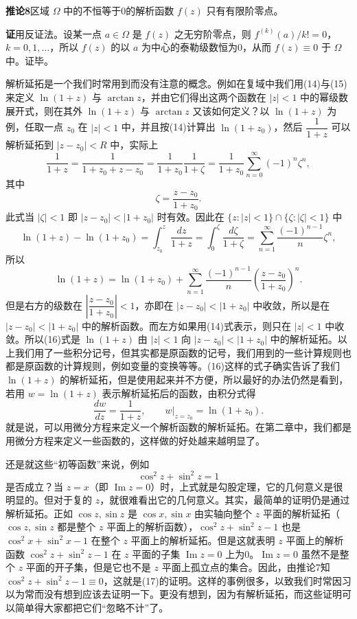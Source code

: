 \noindent\textbf{推论8}\quad 区域 $\Omega$ 中的不恒等于0的解析函数 $f(z)$ 只有有限阶零点。

\noindent\textbf{证}\quad 用反证法。设某一点 $a\in\Omega$ 是 $f(z)$ 之无穷阶零点，则 $f^{(k)}(a)/k!=0$，$k=0,1,\ldots$，所以 $f(z)$ 的以 $a$ 为中心的泰勒级数恒为0，从而 $f(z)\equiv0$ 于 $\Omega$ 中。证毕。

解析延拓是一个我们时常用到而没有注意的概念。例如在复域中我们用(14)与(15)来定义 $\ln(1+z)$ 与 $\arctan z$，并由它们得出这两个函数在 $|z|<1$ 中的幂级数展开式，则在其外 $\ln(1+z)$ 与 $\arctan z$ 又该如何定义？以 $\ln(1+z)$ 为例，任取一点 $z_0$ 在 $|z|<1$ 中，并且按(14)计算出 $\ln(1+z_0)$，然后 $\dfrac1{1+z}$ 可以解析延拓到 $|z-z_0|<R$ 中，实际上
\[
 \frac1{1+z}=\frac1{1+z_0+z-z_0}
 =\frac1{1+z_0}\frac1{1+\zeta}
 =\frac1{1+z_0}\sum_{n=0}^{\infty}(-1)^n\zeta^n,
\]
其中
\[
 \zeta=\frac{z-z_0}{1+z_0}.
\]
此式当 $|\zeta|<1$ 即 $|z-z_0|<|1+z_0|$ 时有效。因此在 $\{z:|z|<1\}\cap\{\zeta:|\zeta|<1\}$ 中
\[
 \ln(1+z)-\ln(1+z_0)=\int_{z_0}^{z}\frac{dz}{1+z}
 =\int_0^{\zeta}\frac{d\zeta}{1+\zeta}
 =\sum_{n=1}^{\infty}\frac{(-1)^{n-1}}n\zeta^n,
\]
所以
\begin{equation}
 \ln(1+z)=\ln(1+z_0)+\sum_{n=1}^{\infty}\frac{(-1)^{n-1}}n
 \left(\frac{z-z_0}{1+z_0}\right)^n.
 \tag{16}
\end{equation}
但是右方的级数在 $\left|\dfrac{z-z_0}{1+z_0}\right|<1$，亦即在 $|z-z_0|<|1+z_0|$ 中收敛，所以是在 $|z-z_0|<|1+z_0|$ 中的解析函数。而左方如果用(14)式表示，则只在 $|z|<1$ 中收敛。所以(16)式是 $\ln(1+z)$ 由 $|z|<1$ 向 $|z-z_0|<|1+z_0|$ 中的解析延拓。以上我们用了一些积分记号，但其实都是原函数的记号，我们用到的一些计算规则也都是原函数的计算规则，例如变量的变换等等。(16)这样的式子确实告诉了我们 $\ln(1+z)$ 的解析延拓，但是使用起来并不方便，所以最好的办法仍然是看到，若用 $w=\ln(1+z)$ 表示解析延拓后的函数，由积分式得
\[
 \frac{dw}{dz}=\frac1{1+z},\qquad w\big|_{z=z_0}=\ln(1+z_0).
\]
就是说，可以用微分方程来定义一个解析函数的解析延拓。在第二章中，我们都是用微分方程来定义一些函数的，这样做的好处越来越明显了。

还是就这些“初等函数”来说，例如
\begin{equation}
 \cos^2z+\sin^2z=1
 \tag{17}
\end{equation}
是否成立？当 $z=x$（即 $\operatorname{Im}z=0$）时，上式就是勾股定理，它的几何意义是很明显的。但对于复的 $z$，就很难看出它的几何意义。其实，最简单的证明仍是通过解析延拓。正如 $\cos z,\sin z$ 是 $\cos x,\sin x$ 由实轴向整个 $z$ 平面的解析延拓（$\cos z,\sin z$ 都是整个 $z$ 平面上的解析函数），$\cos^2z+\sin^2z-1$ 也是 $\cos^2x+\sin^2x-1$ 在整个 $z$ 平面上的解析延拓。但是这就表明 $z$ 平面上的解析函数 $\cos^2z+\sin^2z-1$ 在 $z$ 平面的子集 $\operatorname{Im}z=0$ 上为0。$\operatorname{Im}z=0$ 虽然不是整个 $z$ 平面的开子集，但是它也不是 $z$ 平面上孤立点的集合。因此，由推论7知 $\cos^2z+\sin^2z-1\equiv0$，这就是(17)的证明。这样的事例很多，以致我们时常因习以为常而没有想到应该去证明一下。更没有想到，因为有解析延拓，而这些证明可以简单得大家都把它们“忽略不计”了。

